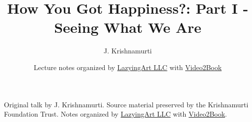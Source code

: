 \documentclass[11pt,oneside]{book}
\begin{document}
\frontmatter
\title{How You Got Happiness?: Part I - Seeing What We Are}
\author{J. Krishnamurti}
\date{Lecture notes organized by \href{https://lazying.art}{LazyingArt LLC} with \href{https://github.com/lachlanchen/Video2Book}{Video2Book}}
\maketitle
\begin{center}
\small Original talk by J. Krishnamurti. Source material preserved by the Krishnamurti Foundation Trust. Notes organized by \href{https://lazying.art}{LazyingArt LLC} with \href{https://github.com/lachlanchen/Video2Book}{Video2Book}.
\end{center}
\clearpage
\mainmatter

\end{document}
